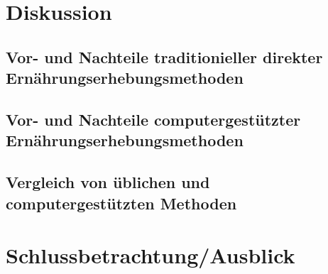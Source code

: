 \section{Diskussion}

\subsection{Vor- und Nachteile traditionieller direkter Ernährungserhebungsmethoden}


\subsection{Vor- und Nachteile computergestützter Ernährungserhebungsmethoden}

\subsection{Vergleich von üblichen und computergestützten Methoden}



\section{Schlussbetrachtung/Ausblick}
